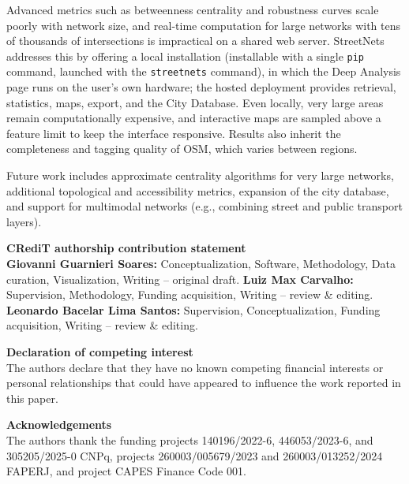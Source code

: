 \documentclass[11pt, letterpaper]{article}
\begin{document}
Advanced metrics such as betweenness centrality and robustness curves scale poorly with network size, and real-time computation for large networks with tens of thousands of intersections is impractical on a shared web server. StreetNets addresses this by offering a local installation (installable with a single \texttt{pip} command, launched with the \texttt{streetnets} command), in which the Deep Analysis page runs on the user's own hardware; the hosted deployment provides retrieval, statistics, maps, export, and the City Database. Even locally, very large areas remain computationally expensive, and interactive maps are sampled above a feature limit to keep the interface responsive. Results also inherit the completeness and tagging quality of OSM, which varies between regions.

Future work includes approximate centrality algorithms for very large networks, additional topological and accessibility metrics, expansion of the city database, and support for multimodal networks (e.g., combining street and public transport layers).

\vskip0.5cm
\noindent
\textbf{CRediT authorship contribution statement}\\
\textbf{Giovanni Guarnieri Soares:} Conceptualization, Software, Methodology, Data curation, Visualization, Writing -- original draft. \textbf{Luiz Max Carvalho:} Supervision, Methodology, Funding acquisition, Writing -- review \& editing. \textbf{Leonardo Bacelar Lima Santos:} Supervision, Conceptualization, Funding acquisition, Writing -- review \& editing.

\vskip0.5cm
\noindent
\textbf{Declaration of competing interest}\\
The authors declare that they have no known competing financial interests or personal relationships that could have appeared to influence the work reported in this paper.

\vskip0.5cm
\noindent
\textbf{Acknowledgements}\\
The authors thank the funding projects 140196/2022-6, 446053/2023-6, and 305205/2025-0 CNPq, projects 260003/005679/2023 and 260003/013252/2024 FAPERJ, and project CAPES Finance Code 001.

\nocite{streetnets_software}


\end{document}
